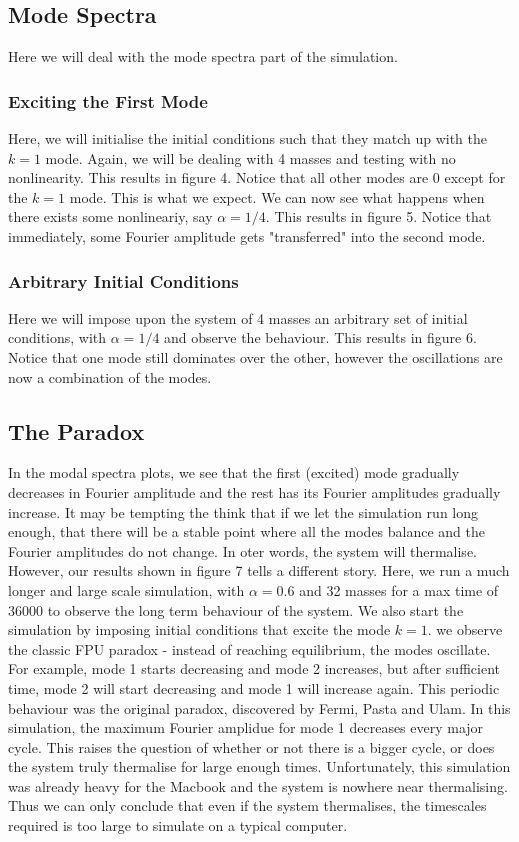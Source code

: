 \documentclass{article}
\begin{document}
\subsection{Mode Spectra}
Here we will deal with the mode spectra part of the simulation.
\subsubsection{Exciting the First Mode}
Here, we will initialise the initial 
conditions such that they match up with the $k=1$ mode. 
Again, we will be dealing with 4 masses and testing with no nonlinearity. This results in 
figure 4. Notice that all other modes are 0 except for the $k=1$ mode. This is what we expect. 
We can now see what happens when there exists some nonlineariy, say $\alpha=1/4$. This results in 
figure 5. Notice that immediately, some Fourier amplitude gets "transferred" into the second mode. 
\subsubsection{Arbitrary Initial Conditions}
Here we will impose upon the system of 4 masses an arbitrary set of initial conditions, with $\alpha=1/4$ and 
observe the behaviour. This results in figure 6. Notice that one mode still dominates over the other, however 
the oscillations are now a combination of the modes.
\subsection{The Paradox}
In the modal spectra plots, we see that the first (excited) mode gradually decreases
in Fourier amplitude and the rest has its Fourier amplitudes gradually increase.
It may be tempting the think that if we let the simulation run long enough, that there will 
be a stable point where all the modes balance and the Fourier amplitudes do not change. In oter words, 
the system will thermalise. However, our results shown in figure 7 tells a different story. Here, 
we run a much longer and large scale simulation, with $\alpha=0.6$ and 32 masses for a max time of 
36000 to observe the long term behaviour of the system. 
We also start the simulation by imposing initial conditions that excite the mode $k=1$. 
 we observe the classic FPU paradox - 
instead of reaching equilibrium, the modes oscillate. For example, mode 1 starts decreasing and 
mode 2 increases, but after sufficient time, mode 2 will start decreasing and mode 1 will increase again. 
This periodic behaviour was the original paradox, discovered by Fermi, Pasta and Ulam. 
In this simulation, the maximum Fourier amplidue for mode 1 decreases every major cycle.
This raises the question of whether or not there is a bigger cycle, or does 
the system truly thermalise for large enough times.
Unfortunately, this simulation was already heavy for the Macbook and the system is 
nowhere near thermalising. Thus we can only conclude that even if the system thermalises,
 the timescales required is too large to simulate on a typical computer. 
\end{document}
